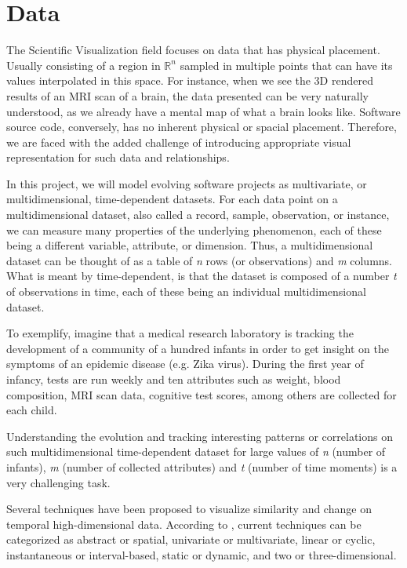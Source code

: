 \section{Data}
The Scientific Visualization field focuses on data that has physical placement. Usually consisting of a region in $\mathbb{R}^{n}$ sampled in multiple points that can have its values interpolated in this space. For instance, when we see the 3D rendered results of an MRI scan of a brain, the data presented can be very naturally understood, as we already have a mental map of what a brain looks like. Software source code, conversely, has no inherent physical or spacial placement. Therefore, we are faced with the added challenge of introducing appropriate visual representation for such data and relationships.

In this project, we will model evolving software projects as multivariate, or multidimensional, time-dependent datasets. For each data point on a multidimensional dataset, also called a record, sample, observation, or instance, we can measure many properties of the underlying phenomenon, each of these being a different variable, attribute, or dimension. Thus, a multidimensional dataset can be thought of as a table of \textit{n} rows (or observations) and \textit{m} columns. What is meant by time-dependent, is that the dataset is composed of a number \textit{t} of observations in time, each of these being an individual multidimensional dataset.

To exemplify, imagine that a medical research laboratory is tracking the development of a community of a hundred infants in order to get insight on the symptoms of an epidemic disease (e.g. Zika virus). During the first year of infancy, tests are run weekly and ten attributes such as weight, blood composition, MRI scan data, cognitive test scores, among others are collected for each child.

Understanding the evolution and tracking interesting patterns or correlations on such multidimensional time-dependent dataset for large values of \textit{n} (number of infants), \textit{m} (number of collected attributes) and \textit{t} (number of time moments) is a very challenging task.

Several techniques have been proposed to visualize similarity and change on temporal high-dimensional data. According to \citet{ref:timedata}, current techniques can be categorized as abstract or spatial, univariate or multivariate, linear or cyclic, instantaneous or interval-based, static or dynamic, and two or three-dimensional.

